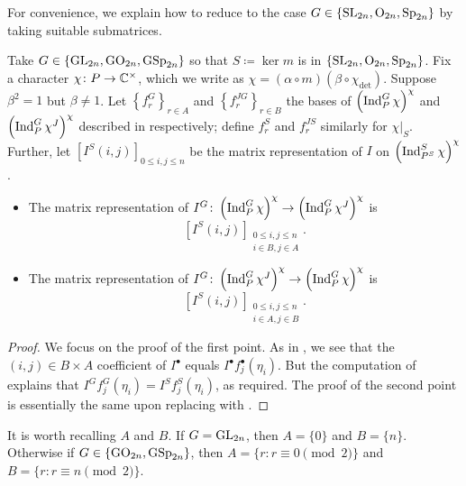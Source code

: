 For convenience, we explain how to reduce to the case $G\in\{\mathrm{SL}_{2n},\mathrm{O}_{2n},\mathrm{Sp}_{2n}\}$ by taking suitable submatrices.
\begin{lemma} \label{lem:general-from-special-matrix}
	Take $G\in\{\mathrm{GL}_{2n},\mathrm{GO}_{2n},\mathrm{GSp}_{2n}\}$ so that $S\coloneqq\ker m$ is in $\{\mathrm{SL}_{2n},\mathrm{O}_{2n},\mathrm{Sp}_{2n}\}$. Fix a character $\chi\colon P\to\mathbb C^\times$, which we write as $\chi=(\alpha\circ m)(\beta\circ\chi_{\det})$.
    Suppose $\beta^2=1$ but $\beta\ne1$.
    Let $\left\{f_r^G\right\}_{r\in A}$ and $\left\{f_r^{JG}\right\}_{r\in B}$ the bases of $\left(\operatorname{Ind}_P^G\chi\right)^\chi$ and $\left(\operatorname{Ind}_P^G\chi^J\right)^{\chi}$ described in  respectively; define $f_r^S$ and $f_r^{JS}$ similarly for $\chi|_S$. Further, let $\left[I^S(i,j)\right]_{0\le i,j\le n}$ be the matrix representation of $I$ on $\left(\operatorname{Ind}_{P^S}^S\chi\right)^\chi$.
	\begin{itemize}
		\item The matrix representation of $I^G\colon\left(\operatorname{Ind}_P^G\chi\right)^\chi\to\left(\operatorname{Ind}_P^G\chi^J\right)^\chi$ is
		\[\left[I^S(i,j)\right]_{\substack{0\le i,j\le n\\i\in B,j\in A}}.\]
		\item The matrix representation of $I^G\colon\left(\operatorname{Ind}_P^G\chi^J\right)^\chi\to\left(\operatorname{Ind}_P^G\chi\right)^\chi$ is
		\[\left[I^S(i,j)\right]_{\substack{0\le i,j\le n\\i\in A,j\in B}}.\]
	\end{itemize}
\end{lemma}
\begin{proof}
    We focus on the proof of the first point. As in , we see that the $(i,j)\in B\times A$ coefficient of $I^\bullet$ equals $I^\bullet f_j^\bullet(\eta_i)$. But the computation of  explains that $I^Gf_j^G(\eta_i)=I^Sf_j^S(\eta_i)$, as required.
	The proof of the second point is essentially the same upon replacing  with .
\end{proof}
\begin{remark}
    It is worth recalling $A$ and $B$. If $G=\mathrm{GL}_{2n}$, then $A=\{0\}$ and $B=\{n\}$. Otherwise if $G\in\{\mathrm{GO}_{2n},\mathrm{GSp}_{2n}\}$, then $A=\{r:r\equiv0\pmod2\}$ and $B=\{r:r\equiv n\pmod2\}$.
\end{remark}
